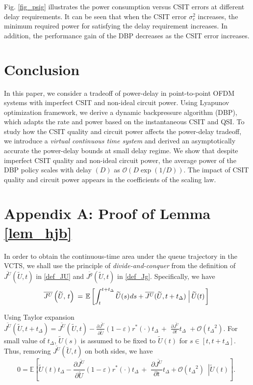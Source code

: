 \documentclass[11pt,journal, onecolumn]{./IEEEtran}
\newcommand{\black}{\color{black}}
\newcommand{\red}{\color{black}}
\begin{document}
\black



Fig. \ref{fig_psig} illustrates the power consumption versus CSIT errors at different delay requirements. It can be seen that when the CSIT error $\sigma^2_e$ increases, the minimum required power for satisfying the delay requirement increases. In addition, the performance gain of the DBP decreases as the CSIT error increases.




\section{Conclusion}
In this paper, we consider a tradeoff of power-delay in point-to-point OFDM systems with imperfect CSIT and non-ideal circuit power. Using Lyapunov optimization framework, we derive a dynamic backpressure algorithm (DBP), which adapts the rate and power based on the instantaneous CSIT and QSI. To study how the CSIT quality and circuit power affects the power-delay tradeoff, we introduce a {\em virtual continuous time system} and derived an asymptotically accurate the power-delay bounds at small delay regime. We show that despite imperfect CSIT quality and non-ideal circuit power, the average power of the DBP policy scales with delay $(D)$ as $\mathcal O(D \exp(1/D))$. The impact of CSIT quality and circuit power appears in the coefficients of the scaling law.





\appendices


\section*{Appendix A: Proof of Lemma \ref{lem_hjb}}\label{app_hjb}
{\red In order to obtain the continuous-time area under the queue trajectory in the VCTS, we shall use the principle of {\em divide-and-conquer} from the definition of $\overline {{J^U}} (\widetilde U,t)$ in \eqref{def_JU} and $\overline {{J^g}} (\widetilde U,t)$ in \eqref{def_Jg}. Specifically, we have}
\[\overline {{J^U}} \left( {\widetilde U,\,t} \right){\mkern 1mu}  = {\mkern 1mu} {\mkern 1mu} \mathbb E\left[ {\int_t^{t + {t_\Delta }} {\widetilde U(s){\mkern 1mu} ds + \overline {{J^U}} ({{\widetilde U}},t + t_\Delta){\mkern 1mu} {\mkern 1mu} \left| {\,\widetilde U(t)} \right.} } \right]{\mkern 1mu} {\mkern 1mu} \]

Using Taylor expansion $\overline {{J^U}} ({\widetilde U},t + {t_\Delta }) = \overline {{J^U}} (\widetilde U,t) - \frac{{\partial \overline {{J^U}} }}{{\partial \widetilde U}}(1 - \varepsilon ){r^*}( \cdot ){t_\Delta }\, + \,\,\frac{{\partial \overline {{J^U}} }}{{\partial t}}{t_\Delta }\,\, + \mathcal O({t_\Delta }^2)$. For small value of $t_\Delta$, $\widetilde U(s)$ is assumed to be fixed to $\widetilde U(t)$ for $s\in[t,t+t_\Delta]$. Thus, removing $\overline {{J^U}} (\widetilde U,t)$ on both sides, we have
\[0 = \mathbb E\left[ {\widetilde U(t){t_\Delta } - \frac{{\partial \overline {{J^U}} }}{{\partial \widetilde U}}(1 - \varepsilon ){r^*}( \cdot ){t_\Delta }\, + \,\,\frac{{\partial \overline {{J^U}} }}{{\partial t}}{t_\Delta } + \mathcal O({t_\Delta }^2)\,\,\,\left| {\widetilde U(t)} \right.} \right].\,\,\]
\end{document}
